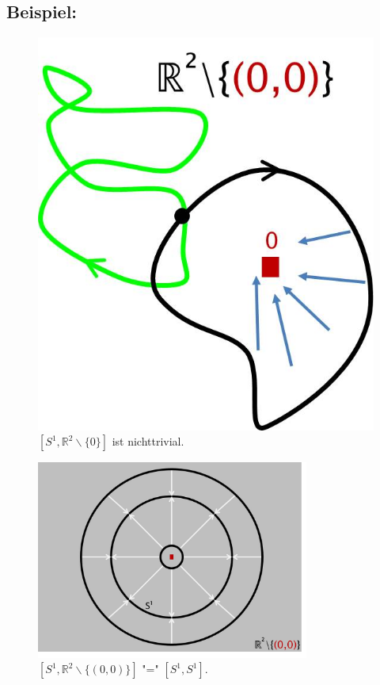 \documentclass[a4paper,11pt,notitlepage]{report}
\theoremstyle{remark}
\theoremstyle{definition}
\newcommand{\R}{{\ensuremath{\mathbb{R}}}}
\newenvironment{bsp}[1]
{
\setlength{\fboxsep}{10pt}
\subsection*{Beispiel: #1}
\begin{upshape}
}
{
\end{upshape}
}
\begin{document}
\begin{bsp}{}
\begin{figure}[h]
\centering
\includegraphics[scale=0.4]{images/Homotop_Schleifen_R_ohne_0.jpg}
\caption{$[S^1, \R^2 \backslash \{0\}]$ ist nichttrivial.}
\end{figure}
\end{bsp}

\begin{figure}[h]
\centering
\includegraphics[width=0.8\textwidth]{images/S1_und_R2_ohne_0.jpg}
\caption{$[S^1,\R^2\backslash\{(0,0)\}]\text{ "=" }[S^1,S^1]$.}
\end{figure}
\end{document}
